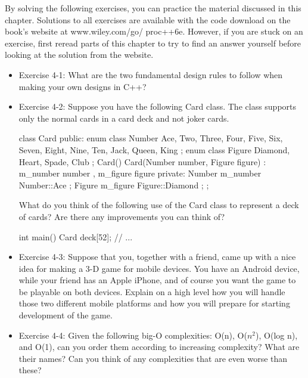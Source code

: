By solving the following exercises, you can practice the material discussed in this chapter. Solutions to all exercises are available with the code download on the book’s website at www.wiley.com/go/ proc++6e. However, if you are stuck on an exercise, first reread parts of this chapter to try to find an answer yourself before looking at the solution from the website.

\begin{itemize}
\item
Exercise 4-1: What are the two fundamental design rules to follow when making your own designs in C++?

\item
Exercise 4-2: Suppose you have the following Card class. The class supports only the normal
cards in a card deck and not joker cards.

\begin{cpp}
class Card
{
    public:
        enum class Number { Ace, Two, Three, Four, Five, Six, Seven, Eight,
            Nine, Ten, Jack, Queen, King };
        enum class Figure { Diamond, Heart, Spade, Club };
        Card() {}
        Card(Number number, Figure figure)
        : m_number { number }, m_figure { figure } {}
    private:
        Number m_number { Number::Ace };
        Figure m_figure { Figure::Diamond };
};
\end{cpp}

What do you think of the following use of the Card class to represent a deck of cards? Are there any improvements you can think of?

\begin{cpp}
int main()
{
    Card deck[52];
    // ...
}
\end{cpp}

\item
Exercise 4-3: Suppose that you, together with a friend, came up with a nice idea for making a 3-D game for mobile devices. You have an Android device, while your friend has an Apple iPhone, and of course you want the game to be playable on both devices. Explain on a high level how you will handle those two different mobile platforms and how you will prepare for starting development of the game.

\item
Exercise 4-4: Given the following big-O complexities: O(n), O($n^2$), O(log n), and O(1), can you order them according to increasing complexity? What are their names? Can you think of any complexities that are even worse than these?
\end{itemize}








